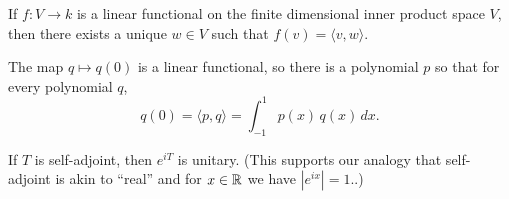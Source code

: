 \documentclass{homework}
\begin{document}
\begin{problem}
  If $f : V \to k$ is a linear functional on the finite dimensional inner product space $V$, then there exists a unique $w \in V$ such that $f(v) = \langle v, w \rangle$.
\end{problem}

\begin{problem}
  The map $q \mapsto q(0)$ is a linear functional, so there is a
  polynomial $p$ so that for every polynomial $q$,
  \[
    q(0) = \langle p, q \rangle = \int_{-1}^1 p(x) \, q(x) \, dx.
  \]
\end{problem}%

\begin{problem}
If $T$ is self-adjoint, then $e^{iT}$ is unitary.  (This supports our analogy that self-adjoint is akin to ``real'' and for $x \in \mathbb{R}$ we have $|e^{ix}| = 1$..) 
\end{problem}
\end{document}
